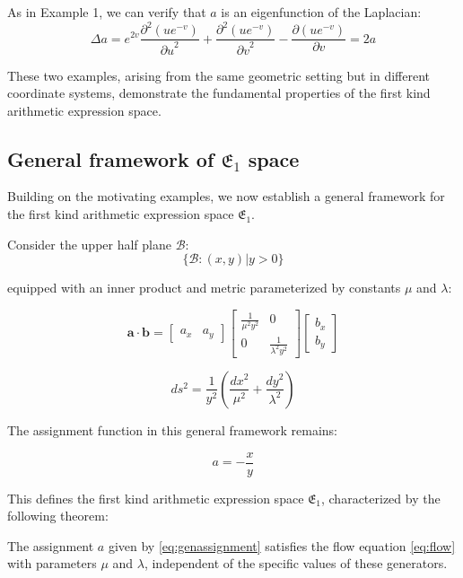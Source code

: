 As in Example 1, we can verify that $a$ is an eigenfunction of the Laplacian:
$$
\Delta a = e^{2v} \frac{\partial^2(u e^{-v})}{{\partial u}^2} + \frac{\partial^2(u e^{-v})}{{\partial v}^2} - \frac{\partial(u e^{-v})}{\partial v} = 2a
$$

These two examples, arising from the same geometric setting but in different coordinate systems, demonstrate the fundamental properties of the first kind arithmetic expression space.

\subsection{General framework of $\mathfrak{E}_1$ space}\label{subsec:generalframework}

Building on the motivating examples, we now establish a general framework for the first kind arithmetic expression space $\mathfrak{E}_1$. 

Consider the upper half plane $\mathcal{B}$:
$$
\{\mathcal{B}: (x, y) | y > 0 \}
$$

equipped with an inner product and metric parameterized by constants $\mu$ and $\lambda$:

$$
\mathbf{a} \cdot \mathbf{b} = \begin{bmatrix} a_x & a_y \end{bmatrix} \begin{bmatrix} \frac{1}{\mu^2 y^2} & 0 \\ 0 & \frac{1}{\lambda^2 y^2} \end{bmatrix} \begin{bmatrix} b_x \\ b_y \end{bmatrix}
$$

$$
ds^2 = \frac{1}{y^2}\left(\frac{dx^2}{\mu^2} + \frac{dy^2}{\lambda^2}\right)
$$

The assignment function in this general framework remains:

\begin{equation}\label{eq:genassignment}
a = - \frac{x}{y}
\end{equation}

This defines the first kind arithmetic expression space $\mathfrak{E}_1$, characterized by the following theorem:

\begin{theorem}\label{thm:generalE1}
The assignment $a$ given by \eqref{eq:genassignment} satisfies the flow equation \eqref{eq:flow} with parameters $\mu$ and $\lambda$, independent of the specific values of these generators.
\end{theorem}

